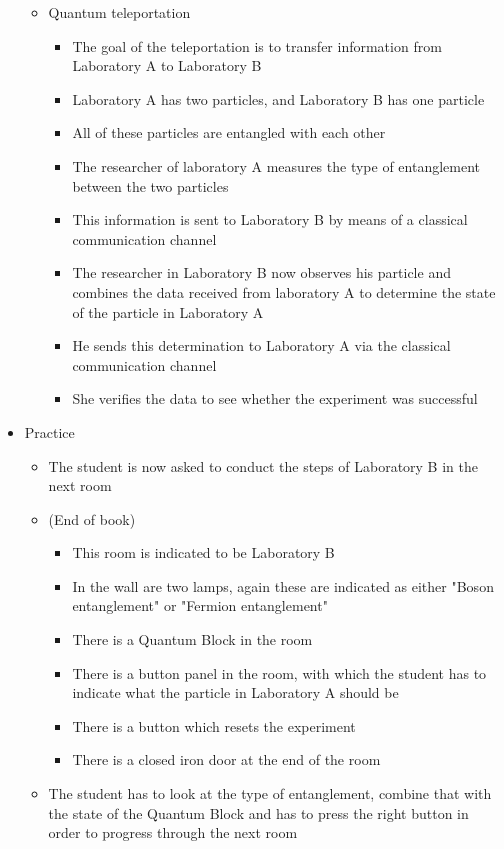 \documentclass[11pt,twoside]{report} %
\begin{document}
\begin{itemize}
\begin{itemize}
\begin{itemize}
			\end{itemize}
			\item Quantum teleportation
			\begin{itemize}
				\item The goal of the teleportation is to transfer information from Laboratory A to Laboratory B
				\item Laboratory A has two particles, and Laboratory B has one particle
				\item All of these particles are entangled with each other
				\item The researcher of laboratory A measures the type of entanglement between the two particles
				\item This information is sent to Laboratory B by means of a classical communication channel
				\item The researcher in Laboratory B now observes his particle and combines the data received from laboratory A to determine the state of the particle in Laboratory A
				\item He sends this determination to Laboratory A via the classical communication channel
				\item She verifies the data to see whether the experiment was successful
			\end{itemize}
		\end{itemize}
		\item Practice
		\begin{itemize}
			\item The student is now asked to conduct the steps of Laboratory B in the next room
			\item (End of book)
			\begin{itemize}
				\item This room is indicated to be Laboratory B
				\item In the wall are two lamps, again these are indicated as either "Boson entanglement" or "Fermion entanglement"
				\item There is a Quantum Block in the room
				\item There is a button panel in the room, with which the student has to indicate what the particle in Laboratory A should be
				\item There is a button which resets the experiment
				\item There is a closed iron door at the end of the room
			\end{itemize}
			\item The student has to look at the type of entanglement, combine that with the state of the Quantum Block and has to press the right button in order to progress through the next room

\end{itemize}
\end{itemize}
\end{document}
